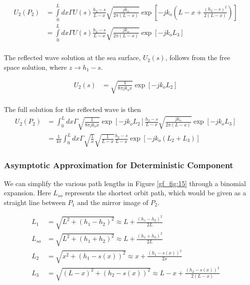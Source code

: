 \begin{equation}
\begin{aligned}
U_2(P_2) &= \int\limits_{0}^{L}dx\Gamma U(s)\frac{h_2-s}{L-x}\sqrt{\frac{jk_o}{2\pi (L-x)}}\exp\left[-jk_o\left(L-x +\frac{(h_2-s)^2}{2(L-x)} \right) \right] \\
&= \int\limits_{0}^{L}dx\Gamma U(s)\frac{h_2-s}{L-x}\sqrt{\frac{jk_o}{2\pi (L-x)}}\exp\left[-jk_oL_3\right] \\
\end{aligned}
\label{gf_eq:56}
\end{equation}
\renewcommand{\baselinestretch}{2} \small\normalsize

The reflected wave solution at the sea surface, $U_2(s)$, follows from the free space solution, where $z \rightarrow h_1-s$.

\begin{equation}
\begin{aligned}
U_2(s) &= \sqrt{\frac{1}{8\pi jk_ox}}\exp\left[-jk_oL_2\right]\\
\end{aligned}
\label{gf_eq:57}
\end{equation}
\renewcommand{\baselinestretch}{2} \small\normalsize

\noindent The full solution for the reflected wave is then 
\begin{equation}
\begin{aligned}
U_2(P_2) &= \int_0^L dx \Gamma \sqrt{\frac{1}{8\pi j k_o x}}\exp[-jk_oL_2]\frac{h_2-s}{L-x}\sqrt{\frac{jk_o}{2\pi(L-x)}}\exp[-jk_oL_3]\\
&= \frac{1}{4\pi}\int_0^L dx \Gamma \sqrt{\frac{1}{x}}\sqrt{\frac{1}{L-x}}\frac{h_2-s}{L-x}\exp\left[-jk_o\left(L_2+L_3\right) \right]
\label{gf_eq:58}
\end{aligned}
\end{equation}
\renewcommand{\baselinestretch}{2} \small\normalsize

\subsubsection{Asymptotic Approximation for Deterministic Component}
We can simplify the various path lengths in Figure \ref{gf_fig:15} through a binomial expansion. Here $L_{so}$ represents the shortest orbit path, which would be given as a straight line between $P_1$ and the mirror image of $P_2$. 

\begin{equation}
\begin{aligned}
L_1 & = \sqrt{L^2 + (h_1-h_2)^2}  \approx L + \frac{(h_1 - h_2)^2}{2L}\\
L_{so} & = \sqrt{L^2 + (h_1+h_2)^2}  \approx L + \frac{(h_1 + h_2)^2}{2L}\\
L_2 &= \sqrt{x^2 + \left( h_1 - s(x)\right)^2}  \approx x + \frac{(h_1-s(x))^2}{2x}\\
L_3 & = \sqrt{\left(L - x\right)^2 + \left( h_2 - s(x)\right)^2}  \approx L-x + \frac{(h_2 - s(x))^2}{2\left(L-x\right)}\\
\end{aligned}
\label{gf_eq:59}
\end{equation}
\renewcommand{\baselinestretch}{2} \small\normalsize

